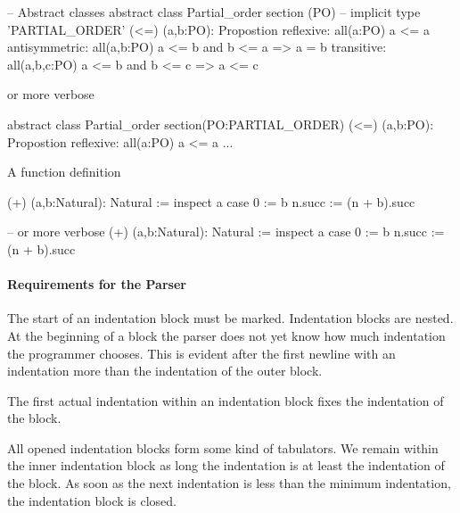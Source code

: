 \begin{alba}
  -- Abstract classes
  abstract class Partial_order section (PO)  -- implicit type 'PARTIAL_ORDER'
    (<=) (a,b:PO): Propostion
    reflexive: all(a:PO)
      a <= a
    antisymmetric: all(a,b:PO)
      a <= b  and  b <= a
      =>  a = b
    transitive: all(a,b,c:PO)
      a <= b and b <= c
      => a <= c
\end{alba}
%
or more verbose
\begin{alba}
  abstract class
    Partial_order
  section(PO:PARTIAL_ORDER)
    (<=) (a,b:PO): Propostion
    reflexive: all(a:PO)
      a <= a
    ...
\end{alba}

A function definition
\begin{alba}
  (+) (a,b:Natural): Natural :=
    inspect a case
      0 := b
      n.succ :=
        (n + b).succ

  -- or more verbose
  (+) (a,b:Natural): Natural :=
    inspect
      a
    case
      0 := b
      n.succ :=
        (n + b).succ
\end{alba}


\paragraph{Requirements for the Parser}
The start of an indentation block must be marked. Indentation blocks are
nested. At the beginning of a block the parser does not yet know how much
indentation the programmer chooses. This is evident after the first newline
with an indentation more than the indentation of the outer block.

The first actual indentation within an indentation block fixes the indentation
of the block.

All opened indentation blocks form some kind of tabulators. We remain within
the inner indentation block as long the indentation is at least the
indentation of the block. As soon as the next indentation is less than the
minimum indentation, the indentation block is closed.


